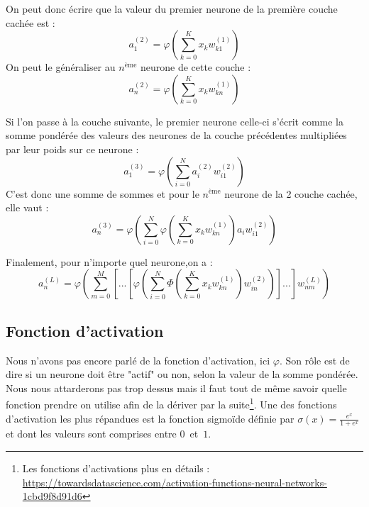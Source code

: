 	On peut donc écrire que la valeur du premier neurone de la première couche cachée est : 
	$$a_1^{(2)} = \varphi\left(\sum_{k=0}^{K}x_kw_{k1}^{(1)}\right)$$
	On peut le généraliser au $n^{\text{ème}}$ neurone de cette couche :
	$$a_n^{(2)} = \varphi\left(\sum_{k=0}^{K}x_kw_{kn}^{(1)}\right)$$
	
	\noindent Si l'on passe à la couche suivante, le premier neurone celle-ci s'écrit comme la somme pondérée des valeurs des neurones de la couche précédentes multipliées par leur poids sur ce neurone : 
	$$a_1^{(3)}  = \varphi\left(\sum_{i=0}^{N}a_i^{(2)}w_{i1}^{(2)}\right)$$
	C'est donc une somme de sommes et pour le $n^{\text{ème}}$ neurone de la 2\ieme{} couche cachée, elle vaut :
	$$a_n^{(3)} = \varphi\left(\sum_{i=0}^{N}\varphi\left(\sum_{k=0}^{K}x_kw_{kn}^{(1)}\right)a_i w_{i1}^{(2)}\right)$$
	
	\noindent Finalement, pour n'importe quel neurone,on a :
	$$ a_n^{(L)} = \varphi\left(\sum_{m=0}^{M}\left[...\left[\varphi\left(\sum_{i=0}^{N}\varPhi\left(\sum_{k=0}^{K}x_kw_{kn}^{(1)}\right)w_{in}^{(2)}\right)\right]...\right]w_{nm}^{(L)}\right) $$
	
	
\subsection{Fonction d'activation}
	Nous n'avons pas encore parlé de la fonction d'activation, ici $\varphi$. Son rôle est de dire si un neurone doit être "actif" ou non, selon la valeur de la somme pondérée. Nous nous attarderons pas trop dessus mais il faut tout de même savoir quelle fonction prendre on utilise afin de la dériver par la suite\footnote{Les fonctions d'activations plus en détails : \url{https://towardsdatascience.com/activation-functions-neural-networks-1cbd9f8d91d6}}. Une des fonctions d'activation les plus répandues est la fonction sigmoïde définie par $\sigma(x) = \frac{e^x}{1+e^x}$ et dont les valeurs sont comprises entre \mbox{$0$ et $1$.}
		
